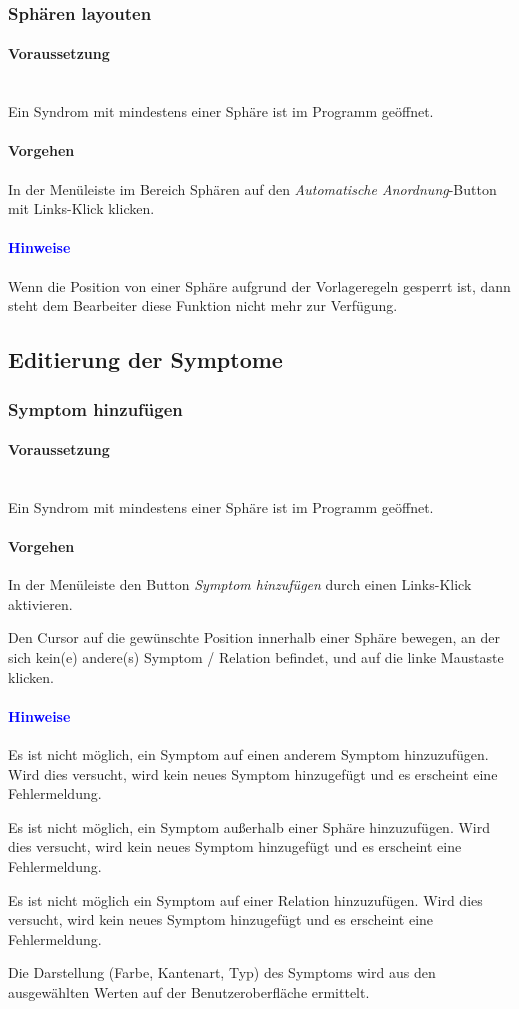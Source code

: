 \documentclass[enabledeprecatedfontcommands,fontsize=11pt,paper=a4,twoside]{scrartcl}
\newcounter{one}
\newcounter{two}[one]
\newcommand*{\hint}{\paragraph{\textcolor{blue}{Hinweise}}}
\newcommand*{\condition}{\paragraph{Voraussetzung}$\;$ \vspace{0.2cm}\\}
\newcommand*{\action}{\paragraph{Vorgehen}}
\let\tempone\itemize
\let\temptwo\enditemize
\renewenvironment{itemize}{\tempone\addtolength{\itemsep}{-10.0pt}}{\temptwo}
\let\origenumerate\enumerate
\let\origendenumerate\endenumerate
\renewenvironment{enumerate}{\origenumerate \addtolength{\itemsep}{-10.0pt}}{\origendenumerate}
\begin{document}
		\subsubsection{Sphären layouten}
		\condition 	
		Ein Syndrom mit mindestens einer Sphäre ist im Programm geöffnet. 
		\action  
		\begin{enumerate}
			\item In der Menüleiste im Bereich Sphären auf den \textit{Automatische Anordnung}-Button mit Links-Klick klicken.
		\end{enumerate}
		\hint
		\begin{itemize}
			\item Wenn die Position von einer Sphäre aufgrund der Vorlageregeln gesperrt ist, dann steht dem Bearbeiter diese Funktion nicht mehr zur Verfügung. \\
		\end{itemize}		
			
				
\subsection{Editierung der Symptome} \label{symptom}
		\subsubsection{Symptom hinzufügen}
		\condition 	
		Ein Syndrom mit mindestens einer Sphäre ist im Programm geöffnet. 
		\action
		\begin{enumerate}
			\item In der Menüleiste den Button \textit{Symptom hinzufügen} durch einen Links-Klick aktivieren.
			\item Den Cursor auf die gewünschte Position innerhalb einer Sphäre bewegen, an der sich kein(e) andere(s) Symptom / Relation befindet, und auf die linke Maustaste klicken.
		\end{enumerate}
		\hint
		\begin{itemize}
			\item Es ist nicht möglich, ein Symptom auf einen anderem Symptom hinzuzufügen. Wird dies versucht, wird kein neues Symptom hinzugefügt und es erscheint eine Fehlermeldung.
			\item Es ist nicht möglich, ein Symptom außerhalb einer Sphäre hinzuzufügen. Wird dies versucht, wird kein neues Symptom hinzugefügt und es erscheint eine Fehlermeldung.
			\item Es ist nicht möglich ein Symptom auf einer Relation hinzuzufügen. Wird dies versucht, wird kein neues Symptom hinzugefügt und es erscheint eine Fehlermeldung.
			\item Die Darstellung (Farbe, Kantenart, Typ) des Symptoms wird aus den ausgewählten Werten auf der Benutzeroberfläche ermittelt. \\
		\end{itemize}
\end{document}

